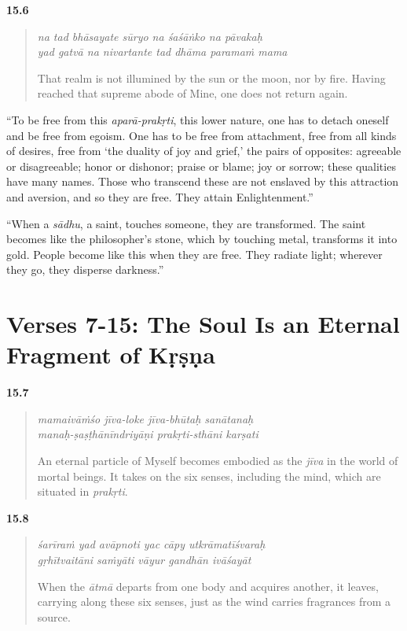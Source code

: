 \par\noindent\textbf{15.6}\par
\begin{verse}
\textit{na tad bhāsayate sūryo na śaśāṅko na pāvakaḥ} \\
\textit{yad gatvā na nivartante tad dhāma paramaṁ mama}

\noindent That realm is not illumined by the sun or the moon, nor by fire. Having reached that supreme abode of Mine, one does not return again.
\end{verse}
\par


\enquote{To be free from this \textit{aparā-prakṛti}, this lower nature, one has to detach oneself and be free from egoism. One has to be free from attachment, free from all kinds of desires, free from \enquote{the duality of joy and grief,} the pairs of opposites: agreeable or disagreeable; honor or dishonor; praise or blame; joy or sorrow; these qualities have many names. Those who transcend these are not enslaved by this attraction and aversion, and so they are free. They attain Enlightenment.}

\enquote{When a \textit{sādhu}, a saint, touches someone, they are transformed. The saint becomes like the philosopher’s stone, which by touching metal, transforms it into gold. People become like this when they are free. They radiate light; wherever they go, they disperse darkness.}

\section{Verses 7-15: The Soul Is an Eternal Fragment of Kṛṣṇa}\label{sec-verses-7-15-the-soul-is-an-eternal-fragment-of-krsna}


\par\noindent\textbf{15.7}\par
\begin{verse}
\textit{mamaivāṁśo jīva-loke jīva-bhūtaḥ sanātanaḥ} \\
\textit{manaḥ-ṣaṣṭhānīndriyāṇi prakṛti-sthāni karṣati}

\noindent An eternal particle of Myself becomes embodied as the \textit{jīva} in the world of mortal beings. It takes on the six senses, including the mind, which are situated in \textit{prakṛti}.
\end{verse}
\par



\par\noindent\textbf{15.8}\par
\begin{verse}
\textit{śarīraṁ yad avāpnoti yac cāpy utkrāmatīśvaraḥ} \\
\textit{gṛhītvaitāni saṁyāti vāyur gandhān ivāśayāt}

\noindent When the \textit{ātmā} departs from one body and acquires another, it leaves, carrying along these six senses, just as the wind carries fragrances from a source.
\end{verse}
\par




